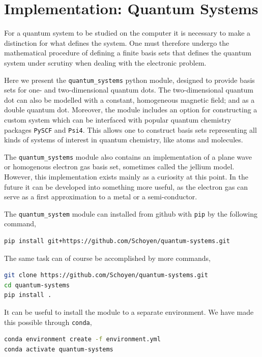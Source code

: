 \chapter{Implementation: Quantum Systems}

For a quantum system to be studied on the computer it is necessary to 
make a distinction for what defines the system. One must therefore undergo the
mathematical procedure of defining a finite basis sets that defines the 
quantum system under scrutiny when dealing with the electronic problem. 

Here we present the \lstinline{quantum_systems} python module, designed to 
provide basis sets for one- and two-dimensional quantum dots. The two-dimensional 
quantum dot can also be modelled with a constant, homogeneous magnetic field; and 
as a double quantum dot. 
Moreover, the module includes an option for constructing a custom system which can 
be interfaced with popular quantum chemistry packages \lstinline{PySCF}\cite{PYSCF} 
and \lstinline{Psi4}\cite{parrish2017psi4}. This allows one to construct basis sets 
representing all kinds of systems of interest in quantum chemistry, like atoms and 
molecules. 

The \lstinline{quantum_systems} module also contains an implementation of 
a plane wave or homogenous electron gas basis set, sometimes called the 
jellium model. However, this implementation exists mainly as 
a curiosity at this point. In the future it can be developed into something more useful,
as the electron gas can serve as a first approximation to a metal or a semi-conductor.

The \lstinline{quantum_system} module can installed from github with \lstinline{pip}
by the following command,
\begin{lstlisting}[language=bash]
pip install git+https://github.com/Schoyen/quantum-systems.git
\end{lstlisting}
The same task can of course be accomplished by more commands,
\begin{lstlisting}[language=bash]
git clone https://github.com/Schoyen/quantum-systems.git
cd quantum-systems
pip install .
\end{lstlisting}


It can be useful to install the module to a separate environment. We have made this 
possible through \lstinline{conda},
\begin{lstlisting}[language=bash]
conda environment create -f environment.yml
conda activate quantum-systems    
\end{lstlisting}

